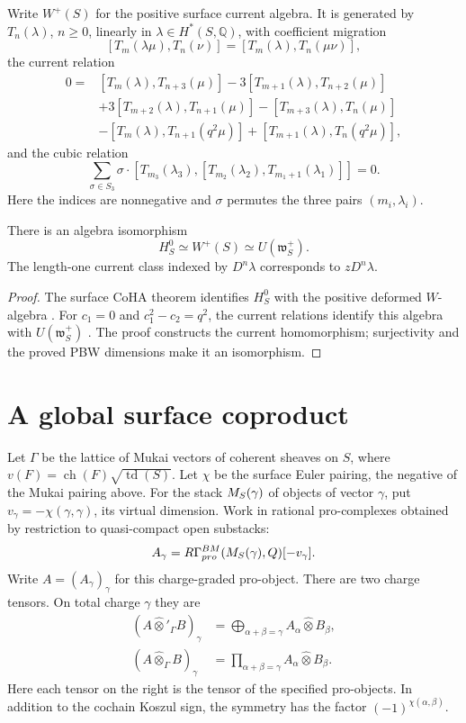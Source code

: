 Write $W^+(S)$ for the positive surface current algebra. It is
generated by $T_n(\lambda)$, $n\geq0$, linearly in
$\lambda\in H^*(S,\mathbb Q)$, with coefficient migration
\[
 [T_m(\lambda\mu),T_n(\nu)]
   =[T_m(\lambda),T_n(\mu\nu)],
\]
the current relation
\[
\begin{aligned}
 0={}&[T_m(\lambda),T_{n+3}(\mu)]
 -3[T_{m+1}(\lambda),T_{n+2}(\mu)]\\
 &+3[T_{m+2}(\lambda),T_{n+1}(\mu)]
 -[T_{m+3}(\lambda),T_n(\mu)]\\
 &-[T_m(\lambda),T_{n+1}(q^2\mu)]
 +[T_{m+1}(\lambda),T_n(q^2\mu)],
\end{aligned}
\]
and the cubic relation
\[
 \sum_{\sigma\in S_3}\sigma\cdot
 [T_{m_3}(\lambda_3),[T_{m_2}(\lambda_2),T_{m_1+1}(\lambda_1)]]=0.
\]
Here the indices are nonnegative and $\sigma$ permutes the three
pairs $(m_i,\lambda_i)$.
\begin{theorem}
There is an algebra isomorphism
\[
 H_S^0\simeq W^+(S)\simeq U(\mathfrak w_S^+).
\]
The length-one current class indexed by $D^n\lambda$ corresponds to
$zD^n\lambda$.
\end{theorem}
\begin{proof}
The surface CoHA theorem identifies $H_S^0$ with the positive
deformed $W$-algebra \cite[Theorem~B]{MMSVSurface}. For $c_1=0$ and
$c_1^2-c_2=q^2$, the current relations identify this algebra with
$U(\mathfrak w_S^+)$ \cite[Theorem~3.5]{MMSVSurface}. The proof
constructs the current homomorphism; surjectivity and the proved PBW
dimensions make it an isomorphism.
\end{proof}

\section{A global surface coproduct}
Let $\Gamma$ be the lattice of Mukai vectors of coherent sheaves on
$S$, where $v(F)=\operatorname{ch}(F)\sqrt{\operatorname{td}(S)}$.
Let $\chi$ be the surface Euler pairing, the negative of the Mukai
pairing above. For the stack $M_S(\gamma)$ of objects of vector
$\gamma$, put $v_\gamma=-\chi(\gamma,\gamma)$, its virtual dimension.
Work in rational
pro-complexes obtained by restriction to quasi-compact open substacks:
\[
 A_\gamma=R\Gamma^{BM}_{pro}
          (M_S(\gamma),Q)[-v_\gamma].
\]
Write $A=(A_\gamma)_\gamma$ for this charge-graded pro-object. There are two charge tensors. On total charge $\gamma$ they are
\[
\begin{aligned}
 (A\widehat\otimes'_{\Gamma}B)_\gamma
 &=\bigoplus_{\alpha+\beta=\gamma}A_\alpha\widehat\otimes B_\beta,\\
 (A\widehat\otimes_{\Gamma}B)_\gamma
 &=\prod_{\alpha+\beta=\gamma}A_\alpha\widehat\otimes B_\beta.
\end{aligned}
\]
Here each tensor on the right is the tensor of the specified pro-objects.
In addition to the cochain Koszul sign, the symmetry has the factor
$(-1)^{\chi(\alpha,\beta)}$.


